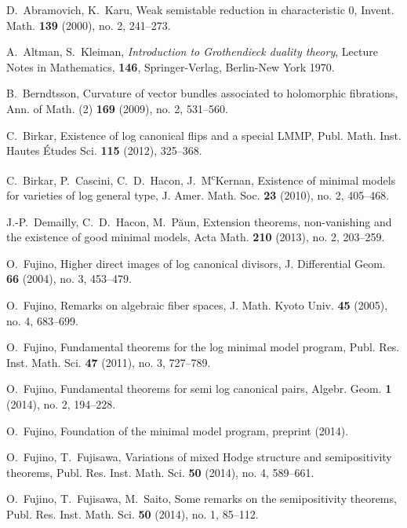 \documentclass[12pt,twoside]{amsart}
\theoremstyle{definition}
\begin{document}
\begin{thebibliography}{BCHM}

D.~Abramovich, K.~Karu, 
Weak semistable reduction in characteristic $0$, 
Invent. Math. {\textbf{139}} (2000), no. 2, 241--273. 

A.~Altman, S.~Kleiman, 
{\em{Introduction to Grothendieck duality theory}}, 
Lecture Notes in Mathematics, {\textbf{146}}, Springer-Verlag, 
Berlin-New York 1970. 

B.~Berndtsson, 
Curvature of vector bundles associated to holomorphic fibrations, 
Ann. of Math. (2) {\textbf{169}} (2009), no. 2, 531--560. 

C.~Birkar, Existence of log canonical flips and a special LMMP, 
Publ. Math. Inst. Hautes \'Etudes Sci. {\textbf{115}} (2012), 325--368.

C.~Birkar, P.~Cascini, C.~D.~Hacon, J.~M\textsuperscript{c}Kernan, 
Existence of minimal models for varieties of log general type, 
J. Amer. Math. Soc. {\textbf{23}} (2010), no. 2, 405--468.

J.-P.~Demailly, C.~D.~Hacon, M.~P\u aun, 
Extension theorems, non-vanishing and the existence of good minimal models, 
Acta Math. {\textbf{210}} (2013), no. 2, 203--259. 

O.~Fujino, 
Higher direct images of log canonical divisors, 
J. Differential Geom. {\textbf{66}} (2004), no. 3, 453--479.

O.~Fujino, Remarks on algebraic fiber spaces, 
J. Math. Kyoto Univ. {\textbf{45}} (2005), no. 4, 683--699.

O.~Fujino, 
Fundamental theorems for the log minimal model program, 
Publ. Res. Inst. Math. Sci. {\textbf{47}} (2011), no. 3, 727--789. 

O.~Fujino, 
Fundamental theorems for semi log canonical pairs, 
Algebr. Geom. {\textbf{1}} (2014), no. 2, 194--228.

O.~Fujino, Foundation of the minimal model program, preprint (2014). 

O.~Fujino, T.~Fujisawa, Variations of mixed Hodge structure and 
semipositivity theorems, 
Publ. Res. Inst. Math. Sci. \textbf{50} (2014), no. 4, 589--661. 

O.~Fujino, T.~Fujisawa, M.~Saito, 
Some remarks on the semipositivity theorems, 
Publ. Res. Inst. Math. Sci. {\textbf{50}} (2014), no. 1, 85--112.


\end{thebibliography}
\end{document}
